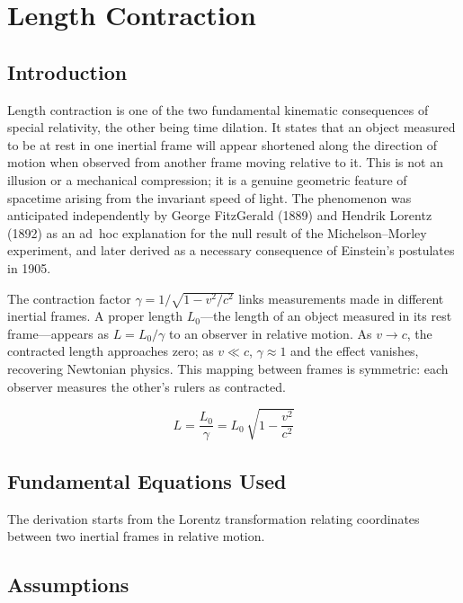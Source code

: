 \chapter{Length Contraction}

\section*{Introduction}

Length contraction is one of the two fundamental kinematic consequences of special relativity, the other being time dilation. It states that an object measured to be at rest in one inertial frame will appear shortened along the direction of motion when observed from another frame moving relative to it. This is not an illusion or a mechanical compression; it is a genuine geometric feature of spacetime arising from the invariant speed of light. The phenomenon was anticipated independently by George FitzGerald (1889) and Hendrik Lorentz (1892) as an ad~hoc explanation for the null result of the Michelson--Morley experiment, and later derived as a necessary consequence of Einstein's postulates in 1905.

The contraction factor $\gamma = 1/\sqrt{1 - v^{2}/c^{2}}$ links measurements made in different inertial frames. A proper length $L_{0}$—the length of an object measured in its rest frame—appears as $L = L_{0}/\gamma$ to an observer in relative motion. As $v \to c$, the contracted length approaches zero; as $v \ll c$, $\gamma \approx 1$ and the effect vanishes, recovering Newtonian physics. This mapping between frames is symmetric: each observer measures the other's rulers as contracted.


\begin{equation}
\boxed{\; L = \frac{L_{0}}{\gamma} = L_{0}\,\sqrt{1 - \frac{v^{2}}{c^{2}}}\;}
\label{eq:length-contraction}
\end{equation}

\section*{Fundamental Equations Used}

The derivation starts from the Lorentz transformation relating coordinates between two inertial frames in relative motion.

\section*{Assumptions}

